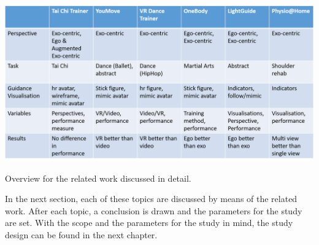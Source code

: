 \begin{table}
	\centering
	\includegraphics[width=1.0\textwidth]{img/detail_paper_overview.png}
	\caption{Overview for the related work discussed in detail.}
	\label{tbl:detailOverviewTable}
\end{table}
In the next section, each of these topics are discussed by means of the related work. After each topic, a conclusion is drawn and the parameters for the study are set. With the scope and the parameters for the study in mind, the study design can be found in the next chapter.

\newpage

